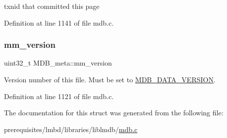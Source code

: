 txnid that committed this page 

Definition at line 1141 of file mdb.\+c.

\mbox{\label{struct_m_d_b__meta_aff649ecae57a8ace4045776e49957d52}} 
\subsubsection{\texorpdfstring{mm\+\_\+version}{mm\_version}}
{\footnotesize\ttfamily uint32\+\_\+t M\+D\+B\+\_\+meta\+::mm\+\_\+version}

Version number of this file. Must be set to \mbox{\hyperlink{group__internal_ga5d462b5ef39d34a85e633eb238655ce2}{M\+D\+B\+\_\+\+D\+A\+T\+A\+\_\+\+V\+E\+R\+S\+I\+ON}}. 

Definition at line 1121 of file mdb.\+c.



The documentation for this struct was generated from the following file\+:\begin{DoxyCompactItemize}
\item 
prerequisites/lmbd/libraries/liblmdb/\mbox{\hyperlink{mdb_8c}{mdb.\+c}}\end{DoxyCompactItemize}
